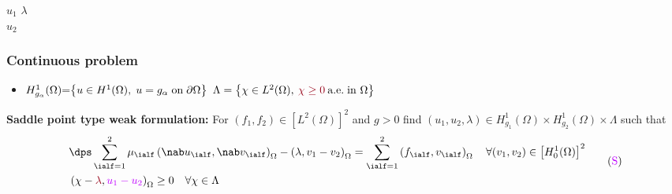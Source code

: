 \begin{frame}
\begin{figure}
\begin{subfigure}[normal]{0.44\textwidth}
\end{subfigure}
\end{figure}
\vspace*{-4.4cm}\hspace*{1.5 cm}$u_1$ \hspace{8 cm} $\lambda$\\
\vspace*{0.7cm}\hspace*{1.5 cm}$u_2$\\
\end{frame}
\begin{frame}
\frametitle{Continuous problem}
\begin{itemize}
\item $H_{g_{\alpha}}^1(\Omega)\hspace{-0.1 cm} =\hspace{-0.1 cm} \left\{u\in H^1(\Omega), \hspace{0.1 cm} u=g_{\alpha} \hspace{0.1 cm} \mbox{on} \hspace{0.1 cm} \partial \Omega\right\}$ \quad $\Lambda=\left\{\chi\in L^2(\Omega), \: \textcolor{carmine}{\chi \geq 0} \: \mbox{a.e.} \hspace{0.1 cm} \mbox{in} \ \Omega\right\}$
\end{itemize}
\textbf{Saddle point type weak formulation:}
For $(f_1,f_2)\in \left[L^2(\Omega)\right]^2$ and $g > 0$ find $(u_1,u_2,\lambda)\in H_{g_1}^1(\Omega) \times H_{g_2}^1(\Omega) \times \Lambda$ such that
\begin{equation*}
\begin{split}
& \dps \sum_{\ialf=1}^2 \mu_\ialf \left(\nab u_\ialf,\nab v_\ialf\right)_{\Omega} - \left(\lambda,v_1-v_2\right)_{\Omega} = \sum_{\ialf=1}^2\left(f_\ialf,v_\ialf\right)_{\Omega} \quad \forall (v_1,v_2) \in \left[H_0^1(\Omega)\right]^2 \\
& \left(\chi - \textcolor{carmine}{\lambda},\textcolor{electricpurple}{u_1-u_2}\right)_{\Omega} \geq 0 
\quad \forall \chi \in \Lambda 
\end{split}
 \tag{$\textcolor{electricpurple}{\mathrm{S}}$}
\end{equation*}
\end{frame}
